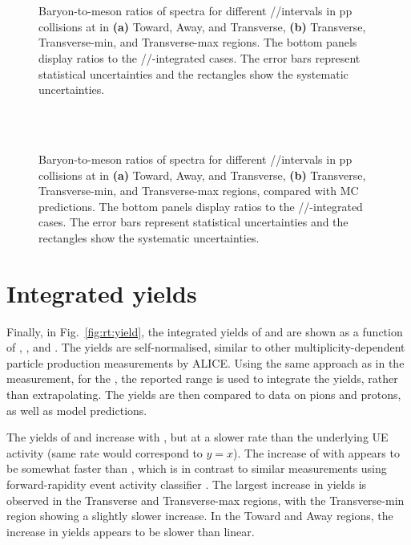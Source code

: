 \begin{figure}[H]%
\\
\\
\caption{Baryon-to-meson ratios of \pt spectra \ltok for different \RT/\RTmin/\RTmax intervals in pp collisions at  in \textbf{(a)} Toward, Away, and Transverse, \textbf{(b)} Transverse, Transverse-min, and Transverse-max regions. The bottom panels display ratios to the \RT/\RTmin/\RTmax-integrated cases. The error bars represent statistical uncertainties and the rectangles show the systematic uncertainties.}
\label{fig:rt:LtoK}
\end{figure}


\begin{figure}[H]%
\\
\\
\caption{Baryon-to-meson ratios of \pt spectra \ltok for different \RT/\RTmin/\RTmax intervals in pp collisions at  in \textbf{(a)} Toward, Away, and Transverse, \textbf{(b)} Transverse, Transverse-min, and Transverse-max regions, compared with MC predictions. The bottom panels display ratios to the \RT/\RTmin/\RTmax-integrated cases. The error bars represent statistical uncertainties and the rectangles show the systematic uncertainties.}
\label{fig:rt:LtoKMC}
\end{figure}

\section{Integrated yields}

Finally, in Fig.~\ref{fig:rt:yield}, the integrated yields of \KOs and \LA are shown as a function of \RT, \RTmin, and \RTmax. The yields are self-normalised, similar to other multiplicity-dependent particle production measurements by ALICE. Using the same approach as in the \SOPT measurement, for the \VOs, the reported \pt range is used to integrate the yields, rather than extrapolating. The yields are then compared to data on pions and protons, as well as model predictions.

The yields of \KOs and \LA increase with \RT, but at a slower rate than the underlying UE activity (same rate would correspond to $y=x$). The increase of \LA with \RT appears to be somewhat faster than \KOs, which is in contrast to similar measurements using forward-rapidity event activity classifier \cite{adamEnhancedProductionMultistrange2017}. The largest increase in yields is observed in the Transverse and Transverse-max regions, with the Transverse-min region showing a slightly slower increase. In the Toward and Away regions, the increase in yields appears to be slower than linear.

